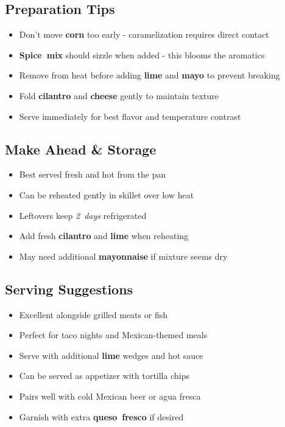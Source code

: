\documentclass[11pt,letterpaper]{article}
\begin{document}
{\begin{multicols}{2}
\subsection*{Preparation Tips}
\begin{itemize}
    \item Don't move \textbf{corn} too early - caramelization requires direct contact
    \item \textbf{Spice~mix} should sizzle when added - this blooms the aromatics
    \item Remove from heat before adding \textbf{lime} and \textbf{mayo} to prevent breaking
    \item Fold \textbf{cilantro} and \textbf{cheese} gently to maintain texture
    \item Serve immediately for best flavor and temperature contrast
\end{itemize}

\subsection*{Make Ahead \& Storage}
\begin{itemize}
    \item Best served fresh and hot from the pan
    \item Can be reheated gently in skillet over low heat
    \item Leftovers keep \textit{2~days} refrigerated
    \item Add fresh \textbf{cilantro} and \textbf{lime} when reheating
    \item May need additional \textbf{mayonnaise} if mixture seems dry
\end{itemize}

\subsection*{Serving Suggestions}
\begin{itemize}
    \item Excellent alongside grilled meats or fish
    \item Perfect for taco nights and Mexican-themed meals
    \item Serve with additional \textbf{lime} wedges and hot sauce
    \item Can be served as appetizer with tortilla chips
    \item Pairs well with cold Mexican beer or agua fresca
    \item Garnish with extra \textbf{queso~fresco} if desired
\end{itemize}

\end{multicols}
}
\end{document}
